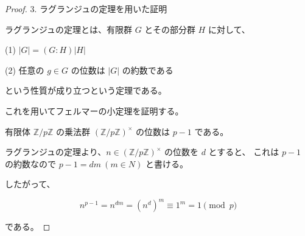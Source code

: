 \begin{proof}

3. ラグランジュの定理を用いた証明

ラグランジュの定理とは、有限群 $G$ とその部分群 $H$ に対して、

(1) $|G| = (G : H)|H|$

(2) 任意の $g \in G$ の位数は $|G|$ の約数である

という性質が成り立つという定理である。

これを用いてフェルマーの小定理を証明する。

有限体 $\mathbb{Z}/p\mathbb{Z}$ の乗法群 $(\mathbb{Z}/p\mathbb{Z})^{\times}$ の位数は $p - 1$ である。

ラグランジュの定理より、$n \in (\mathbb{Z}/p\mathbb{Z})^{\times}$ の位数を $d$ とすると、
これは $p - 1$ の約数なので $p - 1 = dm\ (m \in {N})$ と書ける。

したがって、

\[
n^{p-1} = n^{dm} = (n^d)^m \equiv 1^m = 1 \pmod{p}
\]

である。
\end{proof}
